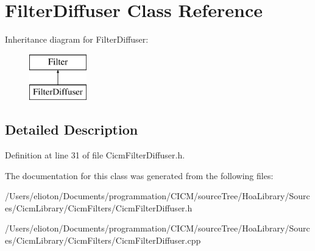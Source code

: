 \hypertarget{class_filter_diffuser}{\section{Filter\-Diffuser Class Reference}
\label{class_filter_diffuser}
}
Inheritance diagram for Filter\-Diffuser\-:\begin{figure}[H]
\begin{center}
\leavevmode
\includegraphics[height=2.000000cm]{class_filter_diffuser}
\end{center}
\end{figure}


\subsection{Detailed Description}


Definition at line 31 of file Cicm\-Filter\-Diffuser.\-h.



The documentation for this class was generated from the following files\-:\begin{DoxyCompactItemize}
\item 
/\-Users/elioton/\-Documents/programmation/\-C\-I\-C\-M/source\-Tree/\-Hoa\-Library/\-Sources/\-Cicm\-Library/\-Cicm\-Filters/Cicm\-Filter\-Diffuser.\-h\item 
/\-Users/elioton/\-Documents/programmation/\-C\-I\-C\-M/source\-Tree/\-Hoa\-Library/\-Sources/\-Cicm\-Library/\-Cicm\-Filters/Cicm\-Filter\-Diffuser.\-cpp\end{DoxyCompactItemize}
